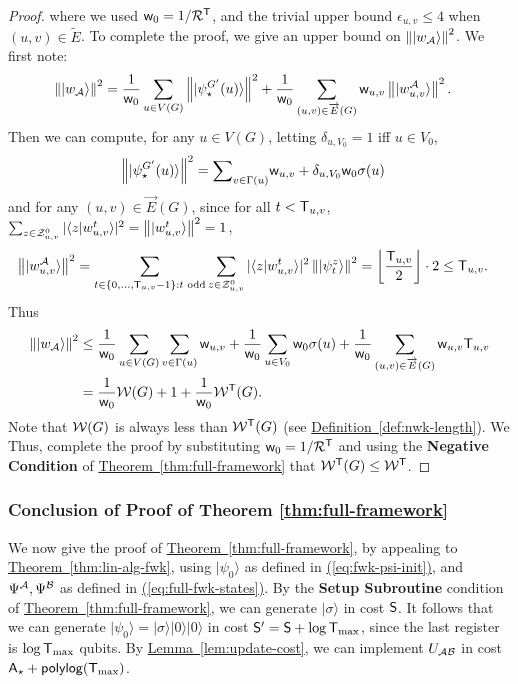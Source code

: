 \documentclass{theoretics}
\newcommand{\eq}[1]{\hyperref[eq:#1]{(\ref*{eq:#1})}}
\newcommand{\thm}[1]{\hyperref[thm:#1]{Theorem~\ref*{thm:#1}}}
\newcommand{\lem}[1]{\hyperref[lem:#1]{Lemma~\ref*{lem:#1}}}
\newcommand{\defin}[1]{\hyperref[def:#1]{Definition~\ref*{def:#1}}}
\def\ket#1{{\lvert}#1\rangle}
\renewcommand{\>}{\rangle}
\newcommand{\<}{\langle}
\renewcommand{\(}{\left(}
\renewcommand{\)}{\right)}
\def\braket#1#2{{{\langle}#1\vert}#2\rangle}
\def\norm#1{\left\| #1 \right\|}
\def\w{{\sf w}}
\begin{document}
\begin{proof}
where we used $\w_0=1/{\cal R}^{\sf T}$, and the trivial upper bound $\epsilon_{u,v}\leq 4$ when $(u,v)\in \tilde{E}$. %
To complete the proof, we give an upper bound on $\norm{\ket{w_{\cal A}}}^2$. We first note:
\begin{align*}
\norm{\ket{w_{\cal A}}}^2 &= \frac{1}{\w_0}\sum_{u\in V(G)}\norm{\ket{\psi_{\star}^{G'}(u)}}^2+\frac{1}{\w_0}\sum_{(u,v)\in\overrightarrow{E}(G)}\w_{u,v}\norm{\ket{w_{u,v}^{\cal A}}}^2.
\end{align*}
Then we can compute, for any $u\in V(G)$, letting $\delta_{u,V_0}=1$ iff $u\in V_0$,
\begin{align*}
\norm{\ket{\psi_{\star}^{G'}(u)}}^2 &= \textstyle{\displaystyle\sum}_{v\in\Gamma(u)}\w_{u,v}+\delta_{u,V_0} \w_0\sigma(u)
\end{align*}
and for any $(u,v)\in\overrightarrow{E}(G)$, since for all $t<{\sf T}_{u,v}$, $\sum_{z\in {\cal Z}_{u,v}^0}|\braket{z}{w_{u,v}^t}|^2=\norm{\ket{w_{u,v}^t}}^2 =1$, 
\begin{align*}
\norm{\ket{w_{u,v}^{\cal A}}}^2 &= \sum_{t\in\{0,\dots,{\sf T}_{u,v}-1\}:t\text{ odd}}\sum_{z\in {\cal Z}_{u,v}^0}|\braket{z}{w_{u,v}^t}|^2\norm{\ket{\psi_t^{z}}}^2 
= \left\lfloor\frac{{\sf T}_{u,v}}{2}\right\rfloor  \cdot 2 \leq {\sf T}_{u,v}.
\end{align*}
Thus
\begin{align*}
\norm{\ket{w_{\cal A}}}^2 &\leq \frac{1}{\w_0}\sum_{u\in V(G)}\sum_{v\in\Gamma(u)}\w_{u,v}+\frac{1}{\w_0}\sum_{u\in V_0} \w_0\sigma(u)+\frac{1}{\w_0}\sum_{(u,v)\in\overrightarrow{E}(G)}\w_{u,v}{\sf T}_{u,v}\\
&= \frac{1}{\w_0}{\cal W}(G)+1+\frac{1}{\w_0}{\cal W}^{\sf T}(G).
\end{align*}
Note that ${\cal W}(G)$ is always less than ${\cal W}^{\sf T}(G)$ (see \defin{nwk-length}). We Thus, complete the proof by substituting $\w_0=1/{{\cal R}^{\sf T}}$ and using the \textbf{Negative Condition} of \thm{full-framework} that ${\cal W}^{\sf T}(G)\leq {\cal W}^{\sf T}$. 
\end{proof}




\subsubsection{Conclusion of Proof of Theorem \ref{thm:full-framework}}

We now give the proof of \thm{full-framework}, by appealing to \thm{lin-alg-fwk}, using $\ket{\psi_0}$ as defined in \eq{fwk-psi-init}, and $\Psi^{\cal A},\Psi^{\cal B}$ as defined in \eq{full-fwk-states}.
By the \textbf{Setup Subroutine} condition of \thm{full-framework}, we can generate $\ket{\sigma}$ in cost ${\sf S}$. It follows that we can generate $\ket{\psi_0}=\ket{\sigma}\ket{0}\ket{0}$ in cost ${\sf S}'={\sf S}+\log{\sf T}_{\max}$, since the last register is $\log {\sf T}_{\max}$ qubits. By \lem{update-cost}, we can implement $U_{\cal AB}$ in cost ${\sf A}_\star+{\sf polylog}({\sf T}_{\max})$. 
\end{document}
